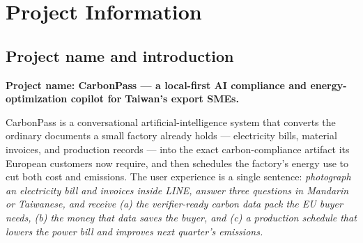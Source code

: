 \section{Project Information}\label{sec:project}

\subsection{Project name and introduction}\label{sec:intro}

\textbf{Project name: CarbonPass --- a local-first AI compliance and
energy-optimization copilot for Taiwan's export SMEs.}

CarbonPass is a conversational artificial-intelligence system that converts the
ordinary documents a small factory already holds --- electricity bills,
material invoices, and production records --- into the exact carbon-compliance
artifact its European customers now require, and then schedules the factory's
energy use to cut both cost and emissions. The user experience is a single
sentence: \emph{photograph an electricity bill and invoices inside LINE, answer
three questions in Mandarin or Taiwanese, and receive (a) the verifier-ready
carbon data pack the EU buyer needs, (b) the money that data saves the buyer,
and (c) a production schedule that lowers the power bill and improves next
quarter's emissions.}

